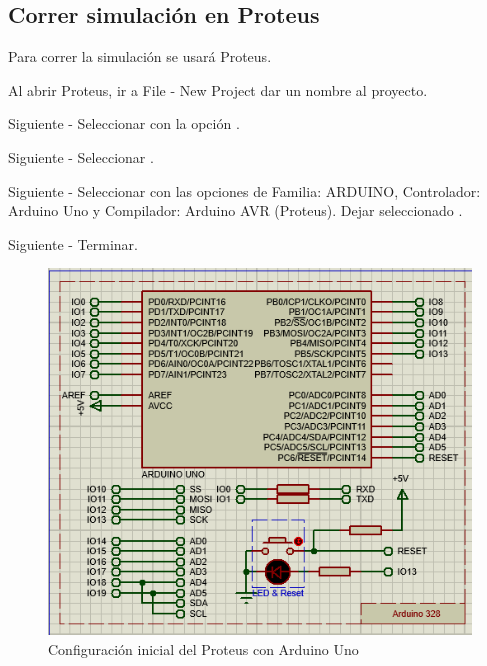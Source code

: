 \documentclass{article}
\begin{document}
    \subsection{Correr simulación en Proteus}

    Para correr la simulación se usará Proteus.

    \bigbreak

    Al abrir Proteus, ir a File - New Project dar un nombre al proyecto.

    \bigbreak

    Siguiente - Seleccionar 
    con la opción .

    \bigbreak

    Siguiente - Seleccionar .

    \bigbreak

    Siguiente - Seleccionar  con las opciones
    de Familia: ARDUINO, Controlador:
    Arduino Uno y Compilador: Arduino AVR (Proteus). Dejar seleccionado
    .

    \bigbreak

    Siguiente - Terminar.

    \begin{figure}[H]
        \centering
        \includegraphics[width=0.5\paperwidth]{images/sim-1}
        \caption{Configuración inicial del Proteus con Arduino Uno}
    \end{figure}
\end{document}
